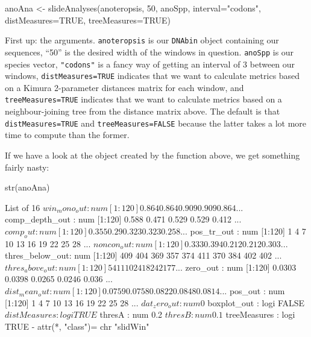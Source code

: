 \documentclass{article}
\newcommand{\fun}[1]{\texttt{#1}}
\begin{document}
\begin{console}
anoAna <- slideAnalyses(anoteropsis, 50, anoSpp, interval="codons", 
distMeasures=TRUE, treeMeasures=TRUE)
\end{console}

First up: the arguments. \fun{anoteropsis} is our \fun{DNAbin} object containing our sequences, ``50'' is the desired width of the windows in question. \fun{anoSpp} is our species vector, \fun{"codons"} is a fancy way of getting an interval of 3 between our windows, \fun{distMeasures=TRUE} indicates that we want to calculate metrics based on a Kimura 2-parameter distances matrix for each window, and \fun{treeMeasures=TRUE} indicates that we want to calculate metrics based on a neighbour-joining tree from the distance matrix above. The default is that \fun{distMeasures=TRUE} and \fun{treeMeasures=FALSE} because the latter takes a lot more time to compute than the former. 

If we have a look at the object created by the function above, we get something fairly nasty:

\begin{console}
str(anoAna)
\end{console}

\begin{Routput}
List of 16
 $ win_mono_out   : num [1:120] 0.864 0.864 0.909 0.909 0.864 ...
 $ comp_depth_out : num [1:120] 0.588 0.471 0.529 0.529 0.412 ...
 $ comp_out       : num [1:120] 0.355 0.29 0.323 0.323 0.258 ...
 $ pos_tr_out     : num [1:120] 1 4 7 10 13 16 19 22 25 28 ...
 $ noncon_out     : num [1:120] 0.333 0.394 0.212 0.212 0.303 ...
 $ thres_below_out: num [1:120] 409 404 369 357 374 411 370 384 402 402 ...
 $ thres_above_out: num [1:120] 5 4 11 10 24 18 24 21 7 7 ...
 $ zero_out       : num [1:120] 0.0303 0.0398 0.0265 0.0246 0.036 ...
 $ dist_mean_out  : num [1:120] 0.0759 0.0758 0.0822 0.0848 0.0814 ...
 $ pos_out        : num [1:120] 1 4 7 10 13 16 19 22 25 28 ...
 $ dat_zero_out   : num 0
 $ boxplot_out    : logi FALSE
 $ distMeasures   : logi TRUE
 $ thresA         : num 0.2
 $ thresB         : num 0.1
 $ treeMeasures   : logi TRUE
 - attr(*, "class")= chr "slidWin"
\end{Routput}
\end{document}
